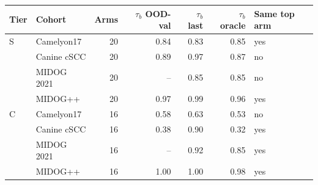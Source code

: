 \begin{tabular*}{\tblwidth}{@{\extracolsep{\fill}}llrrrrl@{}}
\toprule
Tier & Cohort & Arms & $\tau_b$ OOD-val & $\tau_b$ last & $\tau_b$ oracle & Same top arm \\
\midrule
S & Camelyon17 & 20 & 0.84 & 0.83 & 0.85 & yes \\
 & Canine cSCC & 20 & 0.89 & 0.97 & 0.87 & no \\
 & MIDOG 2021 & 20 & -- & 0.85 & 0.85 & no \\
 & MIDOG++ & 20 & 0.97 & 0.99 & 0.96 & yes \\
\addlinespace[3pt]
C & Camelyon17 & 16 & 0.58 & 0.63 & 0.53 & no \\
 & Canine cSCC & 16 & 0.38 & 0.90 & 0.32 & yes \\
 & MIDOG 2021 & 16 & -- & 0.92 & 0.85 & yes \\
 & MIDOG++ & 16 & 1.00 & 1.00 & 0.98 & yes \\
\bottomrule
\end{tabular*}
